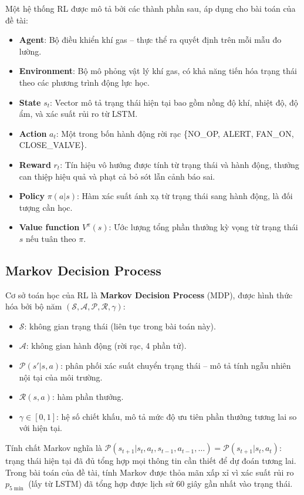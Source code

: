 Một hệ thống RL được mô tả bởi các thành phần sau, áp dụng cho bài toán của đề tài:
\begin{itemize}
  \item \textbf{Agent}: Bộ điều khiển khí gas – thực thể ra quyết định trên mỗi mẫu đo lường.
  \item \textbf{Environment}: Bộ mô phỏng vật lý khí gas, có khả năng tiến hóa trạng thái theo các phương trình động lực học.
  \item \textbf{State} $s_t$: Vector mô tả trạng thái hiện tại bao gồm nồng độ khí, nhiệt độ, độ ẩm, và xác suất rủi ro từ LSTM.
  \item \textbf{Action} $a_t$: Một trong bốn hành động rời rạc \{NO\_OP, ALERT, FAN\_ON, CLOSE\_VALVE\}.
  \item \textbf{Reward} $r_t$: Tín hiệu vô hướng được tính từ trạng thái và hành động, thưởng can thiệp hiệu quả và phạt cả bỏ sót lẫn cảnh báo sai.
  \item \textbf{Policy} $\pi(a|s)$: Hàm xác suất ánh xạ từ trạng thái sang hành động, là đối tượng cần học.
  \item \textbf{Value function} $V^\pi(s)$: Ước lượng tổng phần thưởng kỳ vọng từ trạng thái $s$ nếu tuân theo $\pi$.
\end{itemize}

\subsection{Markov Decision Process}

Cơ sở toán học của RL là \textbf{Markov Decision Process} (MDP), được hình thức hóa bởi bộ năm $(\mathcal{S}, \mathcal{A}, \mathcal{P}, \mathcal{R}, \gamma)$:

\begin{itemize}
  \item $\mathcal{S}$: không gian trạng thái (liên tục trong bài toán này).
  \item $\mathcal{A}$: không gian hành động (rời rạc, 4 phần tử).
  \item $\mathcal{P}(s' | s, a)$: phân phối xác suất chuyển trạng thái – mô tả tính ngẫu nhiên nội tại của môi trường.
  \item $\mathcal{R}(s, a)$: hàm phần thưởng.
  \item $\gamma \in [0, 1]$: hệ số chiết khấu, mô tả mức độ ưu tiên phần thưởng tương lai so với hiện tại.
\end{itemize}

Tính chất Markov nghĩa là $\mathcal{P}(s_{t+1} | s_t, a_t, s_{t-1}, a_{t-1}, \ldots) = \mathcal{P}(s_{t+1} | s_t, a_t)$: trạng thái hiện tại đã đủ tổng hợp mọi thông tin cần thiết để dự đoán tương lai. Trong bài toán của đề tài, tính Markov được thỏa mãn xấp xỉ vì xác suất rủi ro $p_{5\min}$ (lấy từ LSTM) đã tổng hợp được lịch sử 60 giây gần nhất vào trạng thái.

